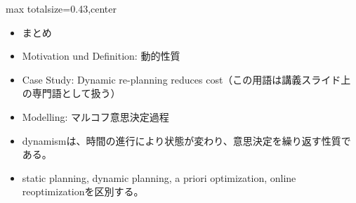 \clearpage
{}
\begin{minipage}[t]{0.405\textwidth}
\begin{adjustbox}{max totalsize={\textwidth}{0.43\textheight},center}
\begin{minipage}{\textwidth}\scriptsize
{}\begin{itemize}
\item まとめ
\item Motivation und Definition: 動的性質
\item Case Study: Dynamic re-planning reduces cost（この用語は講義スライド上の専門語として扱う）
\item Modelling: マルコフ意思決定過程
\end{itemize}\begin{itemize}
\item dynamismは、時間の進行により状態が変わり、意思決定を繰り返す性質である。
\item static planning, dynamic planning, a priori optimization, online reoptimizationを区別する。
\end{itemize}
\end{minipage}
\end{adjustbox}
\end{minipage}\hfill
